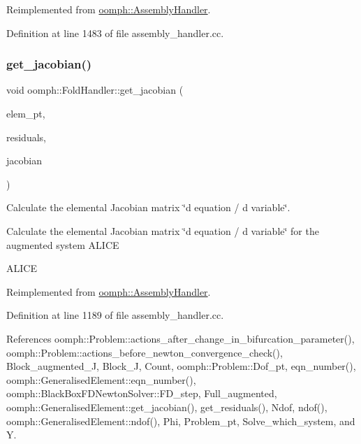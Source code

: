 Reimplemented from \hyperlink{classoomph_1_1AssemblyHandler_a296bef49838d23522bb660c4c5207f03}{oomph\+::\+Assembly\+Handler}.



Definition at line 1483 of file assembly\+\_\+handler.\+cc.

\mbox{\label{classoomph_1_1FoldHandler_ad1bec54a2e0c5bd483ff0bf633bd6542}} 
\subsubsection{\texorpdfstring{get\+\_\+jacobian()}{get\_jacobian()}}
{\footnotesize\ttfamily void oomph\+::\+Fold\+Handler\+::get\+\_\+jacobian (\begin{DoxyParamCaption}\item[{\hyperlink{classoomph_1_1GeneralisedElement}{Generalised\+Element} $\ast$const \&}]{elem\+\_\+pt,  }\item[{\hyperlink{classoomph_1_1Vector}{Vector}$<$ double $>$ \&}]{residuals,  }\item[{\hyperlink{classoomph_1_1DenseMatrix}{Dense\+Matrix}$<$ double $>$ \&}]{jacobian }\end{DoxyParamCaption})\hspace{0.3cm}{\ttfamily [virtual]}}



Calculate the elemental Jacobian matrix \char`\"{}d equation 
/ d variable\char`\"{}. 

Calculate the elemental Jacobian matrix \char`\"{}d equation
/ d variable\char`\"{} for the augmented system A\+L\+I\+CE

A\+L\+I\+CE 

Reimplemented from \hyperlink{classoomph_1_1AssemblyHandler_ad43c3d8760be0ba6ebee8d82509458e5}{oomph\+::\+Assembly\+Handler}.



Definition at line 1189 of file assembly\+\_\+handler.\+cc.



References oomph\+::\+Problem\+::actions\+\_\+after\+\_\+change\+\_\+in\+\_\+bifurcation\+\_\+parameter(), oomph\+::\+Problem\+::actions\+\_\+before\+\_\+newton\+\_\+convergence\+\_\+check(), Block\+\_\+augmented\+\_\+J, Block\+\_\+J, Count, oomph\+::\+Problem\+::\+Dof\+\_\+pt, eqn\+\_\+number(), oomph\+::\+Generalised\+Element\+::eqn\+\_\+number(), oomph\+::\+Black\+Box\+F\+D\+Newton\+Solver\+::\+F\+D\+\_\+step, Full\+\_\+augmented, oomph\+::\+Generalised\+Element\+::get\+\_\+jacobian(), get\+\_\+residuals(), Ndof, ndof(), oomph\+::\+Generalised\+Element\+::ndof(), Phi, Problem\+\_\+pt, Solve\+\_\+which\+\_\+system, and Y.



